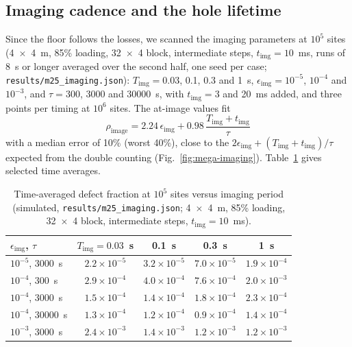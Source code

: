 \subsection{Imaging cadence and the hole lifetime}\label{sec:megascale-imaging}

Since the floor follows the losses, we scanned the imaging parameters at $10^5$ sites (4~$\times$~4~\textmu m, 85\% loading, 32~$\times$~4 block, intermediate steps, $t_\mathrm{img}=10$~ms, runs of 8~s or longer averaged over the second half, one seed per case; \texttt{results/\allowbreak m25\_imaging.json}): $T_\mathrm{img}=0.03$, 0.1, 0.3 and 1~s, $\epsilon_\mathrm{img}=10^{-5}$, $10^{-4}$ and $10^{-3}$, and $\tau=300$, 3000 and 30000~s, with $t_\mathrm{img}=3$ and 20~ms added, and three points per timing at $10^6$ sites. The at-image values fit
\begin{equation}
\rho_\mathrm{image}=2.24\,\epsilon_\mathrm{img}+0.98\,\frac{T_\mathrm{img}+t_\mathrm{img}}{\tau}
\end{equation}
with a median error of 10\% (worst 40\%), close to the $2\epsilon_\mathrm{img}+(T_\mathrm{img}+t_\mathrm{img})/\tau$ expected from the double counting (Fig.~\ref{fig:mega-imaging}). Table~\ref{tab:mega-imaging} gives selected time averages.

\begin{table}[htbp]\centering\small
\caption{Time-averaged defect fraction at $10^5$ sites versus imaging period (simulated, \texttt{results/\allowbreak m25\_imaging.json}; 4~$\times$~4~\textmu m, 85\% loading, 32~$\times$~4 block, intermediate steps, $t_\mathrm{img}=10$~ms).}
\label{tab:mega-imaging}
\begin{tabular}{lcccc}
\toprule
$\epsilon_\mathrm{img}$, $\tau$ & $T_\mathrm{img}=0.03$~s & 0.1~s & 0.3~s & 1~s \\
\midrule
$10^{-5}$, 3000~s & $2.2\times10^{-5}$ & $3.2\times10^{-5}$ & $7.0\times10^{-5}$ & $1.9\times10^{-4}$ \\
$10^{-4}$, 300~s & $2.9\times10^{-4}$ & $4.0\times10^{-4}$ & $7.6\times10^{-4}$ & $2.0\times10^{-3}$ \\
$10^{-4}$, 3000~s & $1.5\times10^{-4}$ & $1.4\times10^{-4}$ & $1.8\times10^{-4}$ & $2.3\times10^{-4}$ \\
$10^{-4}$, 30000~s & $1.3\times10^{-4}$ & $1.2\times10^{-4}$ & $0.9\times10^{-4}$ & $1.4\times10^{-4}$ \\
$10^{-3}$, 3000~s & $2.4\times10^{-3}$ & $1.4\times10^{-3}$ & $1.2\times10^{-3}$ & $1.2\times10^{-3}$ \\
\bottomrule
\end{tabular}
\end{table}

